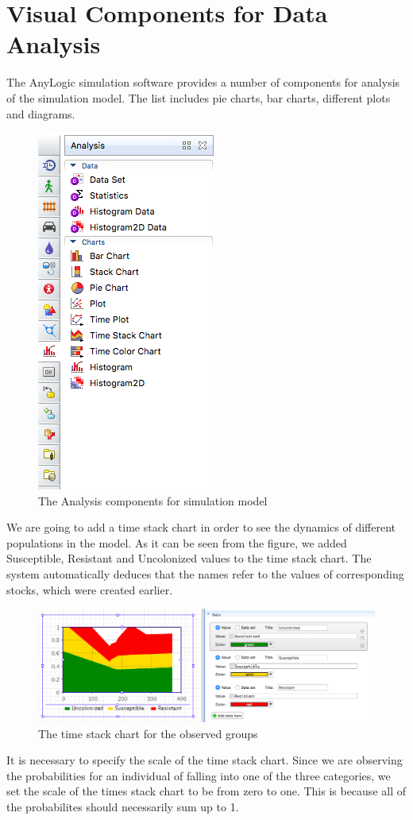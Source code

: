 \section{Visual Components for Data Analysis}

The AnyLogic simulation software provides a number of components for analysis of the simulation model. The list includes pie charts, bar charts, different plots and diagrams.

\begin{figure}[H]
  \centering
  \includegraphics[height=0.5\textwidth]{img/screens/charts/charts1}
  \caption{The Analysis components for simulation model}
\end{figure}

We are going to add a time stack chart in order to see the dynamics of different populations in the model. As it can be seen from the figure, we added Susceptible, Resistant and Uncolonized values to the time stack chart. The system automatically deduces that the names refer to the values of corresponding stocks, which were created earlier.

\begin{figure}[H]
  \centering
  \includegraphics[width=\textwidth]{img/screens/charts/charts5}
  \caption{The time stack chart for the observed groups}
\end{figure}

It is necessary to specify the scale of the time stack chart. Since we are observing the probabilities for an individual of falling into one of the three categories, we set the scale of the times stack chart to be from zero to one. This is because all of the probabilites should necessarily sum up to 1.

